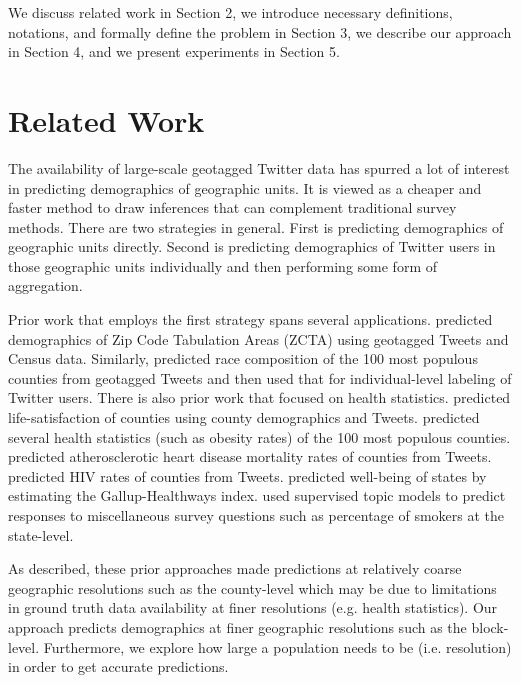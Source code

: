 \documentclass[letterpaper]{article}
\begin{document}
We discuss related work in Section 2, we introduce necessary definitions, notations, and formally define the problem in Section 3, we describe our approach in Section 4, and we present experiments in Section 5. 

\section{Related Work}

\noindent The availability of large-scale geotagged Twitter data has spurred a lot of interest in predicting demographics of geographic units. It is viewed as a cheaper and faster method to draw inferences that can complement traditional survey methods. There are two strategies in general. First is predicting demographics of geographic units directly. Second is predicting demographics of Twitter users in those geographic units individually and then performing some form of aggregation. 

Prior work that employs the first strategy spans several applications. \citeauthor{eisenstein2011discovering}  predicted demographics of Zip Code Tabulation Areas (ZCTA) using geotagged Tweets and Census data. Similarly, \citeauthor{mohammady2014using}  predicted race composition of the 100 most populous counties from geotagged Tweets and then used that for individual-level labeling of Twitter users. There is also prior work that focused on health statistics. \citeauthor{schwartz2013characterizing}  predicted life-satisfaction of counties using county demographics and Tweets. \citeauthor{culotta2014estimating}  predicted several health statistics (such as obesity rates) of the 100 most populous counties. \citeauthor{eichstaedt2015psychological}  predicted atherosclerotic heart disease mortality rates of counties from Tweets. \citeauthor{ireland2015future}  predicted HIV rates of counties from Tweets. \citeauthor{loff2015predicting}  predicted well-being of states by estimating the Gallup-Healthways index. \citeauthor{benton2016collective}  used supervised topic models to predict responses to miscellaneous survey questions such as percentage of smokers at the state-level.

As described, these prior approaches made predictions at relatively coarse geographic resolutions such as the county-level which may be due to limitations in ground truth data availability at finer resolutions (e.g. health statistics). Our approach predicts demographics at finer geographic resolutions such as the block-level. Furthermore, we explore how large a population needs to be (i.e. resolution) in order to get accurate predictions.
\end{document}
